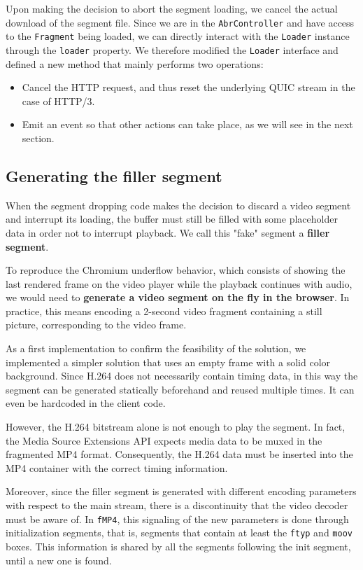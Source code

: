 Upon making the decision to abort the segment loading, we cancel the actual download of the segment file. Since we are in the \texttt{AbrController} and have access to the \texttt{Fragment} being loaded, we can directly interact with the \texttt{Loader} instance through the \texttt{loader} property. We therefore modified the \texttt{Loader} interface and defined a new method that mainly performs two operations:

\begin{itemize}
    \item Cancel the HTTP request, and thus reset the underlying QUIC stream in the case of HTTP/3.
    \item Emit an event so that other actions can take place, as we will see in the next section.
\end{itemize}

\subsection{Generating the filler segment}
\label{sec:improvements/impl/filler}

When the segment dropping code makes the decision to discard a video segment and interrupt its loading, the buffer must still be filled with some placeholder data in order not to interrupt playback. We call this "fake" segment a \textbf{filler segment}.

To reproduce the Chromium underflow behavior, which consists of showing the last rendered frame on the video player while the playback continues with audio, we would need to \textbf{generate a video segment on the fly in the browser}. In practice, this means encoding a 2-second video fragment containing a still picture, corresponding to the video frame.

As a first implementation to confirm the feasibility of the solution, we implemented a simpler solution that uses an empty frame with a solid color background. Since H.264 does not necessarily contain timing data, in this way the segment can be generated statically beforehand and reused multiple times. It can even be hardcoded in the client code.

However, the H.264 bitstream alone is not enough to play the segment. In fact, the Media Source Extensions API expects media data to be muxed in the fragmented MP4 format. Consequently, the H.264 data must be inserted into the MP4 container with the correct timing information.

Moreover, since the filler segment is generated with different encoding parameters with respect to the main stream, there is a discontinuity that the video decoder must be aware of. In \texttt{fMP4}, this signaling of the new parameters is done through initialization segments, that is, segments that contain at least the \texttt{ftyp} and \texttt{moov} boxes. This information is shared by all the segments following the init segment, until a new one is found.

